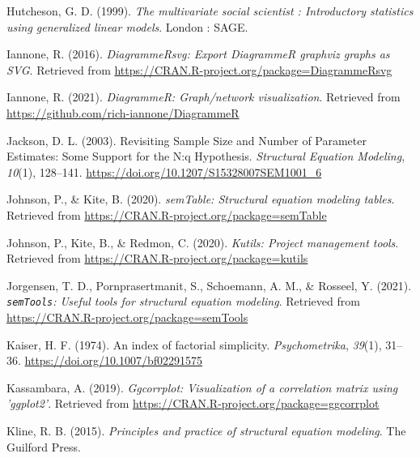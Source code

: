 \documentclass[
  english,
  man]{apa6}
\newlength{\cslhangindent}
\newlength{\cslentryspacingunit} %
\newenvironment{CSLReferences}[2] %
 {%
  \setlength{\parindent}{0pt}
  \ifodd #1
  \let\oldpar\par
  \def\par{\hangindent=\cslhangindent\oldpar}
  \fi
  \setlength{\parskip}{#2\cslentryspacingunit}
 }%
 {}
\begin{document}
\begin{CSLReferences}{1}{0}
\leavevmode{}%
Hutcheson, G. D. (1999). \emph{The multivariate social scientist : Introductory statistics using generalized linear models}. {London : SAGE}.

\leavevmode{}%
Iannone, R. (2016). \emph{DiagrammeRsvg: Export DiagrammeR graphviz graphs as SVG}. Retrieved from \url{https://CRAN.R-project.org/package=DiagrammeRsvg}

\leavevmode{}%
Iannone, R. (2021). \emph{DiagrammeR: Graph/network visualization}. Retrieved from \url{https://github.com/rich-iannone/DiagrammeR}

\leavevmode{}%
Jackson, D. L. (2003). Revisiting {Sample Size} and {Number} of {Parameter Estimates}: {Some Support} for the {N}:q {Hypothesis}. \emph{Structural Equation Modeling}, \emph{10}(1), 128--141. \url{https://doi.org/10.1207/S15328007SEM1001_6}

\leavevmode{}%
Johnson, P., \& Kite, B. (2020). \emph{semTable: Structural equation modeling tables}. Retrieved from \url{https://CRAN.R-project.org/package=semTable}

\leavevmode{}%
Johnson, P., Kite, B., \& Redmon, C. (2020). \emph{Kutils: Project management tools}. Retrieved from \url{https://CRAN.R-project.org/package=kutils}

\leavevmode{}%
Jorgensen, T. D., Pornprasertmanit, S., Schoemann, A. M., \& Rosseel, Y. (2021). \emph{\texttt{semTools}: {U}seful tools for structural equation modeling}. Retrieved from \url{https://CRAN.R-project.org/package=semTools}

\leavevmode{}%
Kaiser, H. F. (1974). An index of factorial simplicity. \emph{Psychometrika}, \emph{39}(1), 31--36. \url{https://doi.org/10.1007/bf02291575}

\leavevmode{}%
Kassambara, A. (2019). \emph{Ggcorrplot: Visualization of a correlation matrix using 'ggplot2'}. Retrieved from \url{https://CRAN.R-project.org/package=ggcorrplot}

\leavevmode{}%
Kline, R. B. (2015). \emph{Principles and practice of structural equation modeling}. {The Guilford Press}.


\end{CSLReferences}
\end{document}
